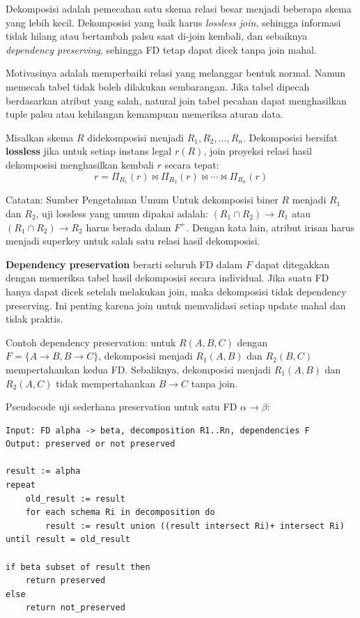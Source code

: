 \begin{jawab}
Dekomposisi adalah pemecahan satu skema relasi besar menjadi beberapa skema yang lebih kecil. Dekomposisi yang baik harus \textit{lossless join}, sehingga informasi tidak hilang atau bertambah palsu saat di-join kembali, dan sebaiknya \textit{dependency preserving}, sehingga FD tetap dapat dicek tanpa join mahal.
\end{jawab}

Motivasinya adalah memperbaiki relasi yang melanggar bentuk normal. Namun memecah tabel tidak boleh dilakukan sembarangan. Jika tabel dipecah berdasarkan atribut yang salah, natural join tabel pecahan dapat menghasilkan tuple palsu atau kehilangan kemampuan memeriksa aturan data.

Misalkan skema \(R\) didekomposisi menjadi \(R_1, R_2, \ldots, R_n\). Dekomposisi bersifat \textbf{lossless} jika untuk setiap instans legal \(r(R)\), join proyeksi relasi hasil dekomposisi menghasilkan kembali \(r\) secara tepat:
\begin{equation}
    r = \Pi_{R_1}(r) \bowtie \Pi_{R_2}(r) \bowtie \cdots \bowtie \Pi_{R_n}(r)
    \label{eq:lossless-join}
\end{equation}

\begin{cmt}{Catatan: Sumber Pengetahuan Umum}{}
Untuk dekomposisi biner \(R\) menjadi \(R_1\) dan \(R_2\), uji lossless yang umum dipakai adalah: \((R_1 \cap R_2) \rightarrow R_1\) atau \((R_1 \cap R_2) \rightarrow R_2\) harus berada dalam \(F^+\). Dengan kata lain, atribut irisan harus menjadi superkey untuk salah satu relasi hasil dekomposisi.
\end{cmt}

\textbf{Dependency preservation} berarti seluruh FD dalam \(F\) dapat ditegakkan dengan memeriksa tabel hasil dekomposisi secara individual. Jika suatu FD hanya dapat dicek setelah melakukan join, maka dekomposisi tidak dependency preserving. Ini penting karena join untuk memvalidasi setiap update mahal dan tidak praktis.

Contoh dependency preservation: untuk \(R(A,B,C)\) dengan \(F=\{A \rightarrow B, B \rightarrow C\}\), dekomposisi menjadi \(R_1(A,B)\) dan \(R_2(B,C)\) mempertahankan kedua FD. Sebaliknya, dekomposisi menjadi \(R_1(A,B)\) dan \(R_2(A,C)\) tidak mempertahankan \(B \rightarrow C\) tanpa join.

Pseudocode uji sederhana preservation untuk satu FD \(\alpha \rightarrow \beta\):
\begin{lstlisting}[caption={Pseudocode uji dependency preservation}, label={lst:dependency-preservation}]
Input: FD alpha -> beta, decomposition R1..Rn, dependencies F
Output: preserved or not preserved

result := alpha
repeat
    old_result := result
    for each schema Ri in decomposition do
        result := result union ((result intersect Ri)+ intersect Ri)
until result = old_result

if beta subset of result then
    return preserved
else
    return not_preserved
\end{lstlisting}

